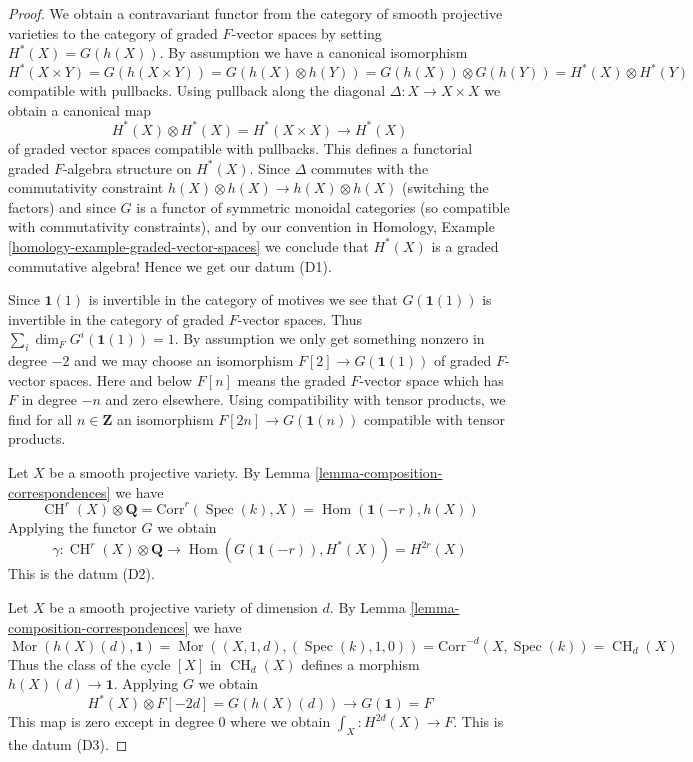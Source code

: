 \documentclass[10pt,a4paper]{amsart}
\theoremstyle{plain}
\theoremstyle{definition}
\theoremstyle{remark}
\numberwithin{equation}{subsection}
\def\Spec{\mathop{\mathrm{Spec}}}
\def\Hom{\mathop{\mathrm{Hom}}\nolimits}
\def\Mor{\mathop{\mathrm{Mor}}\nolimits}
\def\CH{\mathop{\mathrm{CH}}\nolimits}
\begin{document}
\begin{proof}
We obtain a contravariant functor from the category of smooth
projective varieties to the category of graded $F$-vector spaces
by setting $H^*(X) = G(h(X))$. By assumption we have a canonical
isomorphism
$$
H^*(X \times Y) = G(h(X \times Y)) = G(h(X) \otimes h(Y)) =
G(h(X)) \otimes G(h(Y)) = H^*(X) \otimes H^*(Y)
$$
compatible with pullbacks. Using pullback along the diagonal
$\Delta : X \to X \times X$ we obtain a canonical map
$$
H^*(X) \otimes H^*(X) = H^*(X \times X) \to H^*(X)
$$
of graded vector spaces compatible with pullbacks.
This defines a functorial graded $F$-algebra structure on
$H^*(X)$. Since $\Delta$ commutes with the commutativity
constraint $h(X) \otimes h(X) \to h(X) \otimes h(X)$ (switching the factors)
and since $G$ is a functor of symmetric monoidal categories (so compatible with
commutativity constraints), and by our convention in
Homology, Example \ref{homology-example-graded-vector-spaces}
we conclude that $H^*(X)$ is a graded
commutative algebra! Hence we get our datum (D1).

\medskip\noindent
Since $\mathbf{1}(1)$ is invertible in the category of motives
we see that $G(\mathbf{1}(1))$ is invertible in the category of
graded $F$-vector spaces. Thus $\sum_i \dim_F G^i(\mathbf{1}(1)) = 1$.
By assumption we only get something nonzero in degree $-2$ and we may
choose an isomorphism $F[2] \to G(\mathbf{1}(1))$ of graded $F$-vector spaces.
Here and below $F[n]$ means the graded $F$-vector space which has
$F$ in degree $-n$ and zero elsewhere. Using compatibility with
tensor products, we find for all $n \in \mathbf{Z}$ an isomorphism
$F[2n] \to G(\mathbf{1}(n))$ compatible with tensor products.

\medskip\noindent
Let $X$ be a smooth projective variety. By
Lemma \ref{lemma-composition-correspondences} we have
$$
\CH^r(X) \otimes \mathbf{Q} = \text{Corr}^r(\Spec(k), X) =
\Hom(\mathbf{1}(-r), h(X))
$$
Applying the functor $G$ we obtain
$$
\gamma :
\CH^r(X) \otimes \mathbf{Q} \longrightarrow
\Hom(G(\mathbf{1}(-r)), H^*(X)) = H^{2r}(X)
$$
This is the datum (D2).

\medskip\noindent
Let $X$ be a smooth projective variety of dimension $d$. By
Lemma \ref{lemma-composition-correspondences} we have
$$
\Mor(h(X)(d), \mathbf{1}) = \Mor((X, 1, d), (\Spec(k), 1, 0)) =
\text{Corr}^{-d}(X, \Spec(k)) = \CH_d(X)
$$
Thus the class of the cycle $[X]$ in $\CH_d(X)$ defines a morphism
$h(X)(d) \to \mathbf{1}$. Applying $G$ we obtain
$$
H^*(X) \otimes F[-2d] = G(h(X)(d)) \longrightarrow G(\mathbf{1}) = F
$$
This map is zero except in degree $0$ where we obtain
$\int_X : H^{2d}(X) \to F$. This is the datum (D3).


\end{proof}
\end{document}
